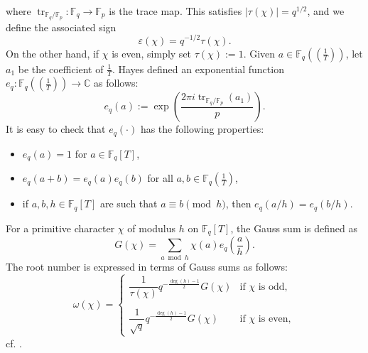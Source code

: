 \documentclass[table]{amsart}
\newcommand{\F}{\mathbb{F}}
\newcommand{\op}[1]{\operatorname{#1}}
\numberwithin{equation}{section}
\begin{document}
where $\op{tr}_{\F_q/\F_p}: \F_q\rightarrow \F_p$ is the trace map. This satisfies \(|\tau(\chi)| = q^{1/2}\), and we define the associated sign  
\[
\varepsilon(\chi) = q^{-1/2} \tau(\chi).
\] On the other hand, if $\chi$ is even, simply set $\tau(\chi):=1$. Given $a\in \F_q\left((\frac{1}{T})\right)$, let $a_1$ be the coefficient of $\frac{1}{T}$. Hayes defined an exponential function $e_q: \F_q\left((\frac{1}{T})\right)\rightarrow  \mathbb{C}$ as follows:
\[e_q(a):=\op{exp}\left(\frac{2\pi i  \op{tr}_{\F_q/\F_p} (a_1)}{p}\right).\] It is easy to check that $e_q(\cdot)$ has the following properties:
\begin{itemize}
    \item $e_q(a)=1$ for $a\in \F_q[T]$, 
    \item $e_q(a+b)=e_q(a)e_q(b)$ for all $a, b\in \F_q\left(\frac{1}{T}\right)$,
    \item if $a, b, h\in \F_q[T]$ are such that $a\equiv b\pmod{h}$, then $e_q(a/h)=e_q(b/h)$.
\end{itemize}
For a primitive character \(\chi\) of modulus \(h\) on \(\mathbb{F}_q[T]\), the Gauss sum is defined as  
\[
G(\chi) = \sum_{a \bmod h} \chi(a) e_q \left(\frac{a}{h} \right).
\]  
The root number is expressed in terms of Gauss sums as follows:  
\begin{equation}\label{omega function}
    \omega(\chi) =  
\begin{cases}  
\dfrac{1}{\tau(\chi)} q^{-\frac{\op{deg}(h) - 1}{2}} G(\chi) & \text{if } \chi \text{ is odd}, \\  \\
\dfrac{1}{\sqrt{q}} q^{-\frac{\op{deg}(h) - 1}{2}} G(\chi) & \text{if } \chi \text{ is even}, 
\end{cases}  
\end{equation}
cf. \cite[Corollary 2.3]{DFLCubic}.
\end{document}
